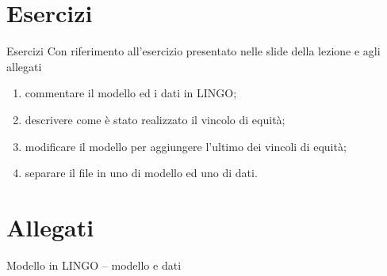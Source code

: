 \documentclass{beamer}
\begin{document}
\generatitolo

\section{Esercizi}

\begin{frame}
{Esercizi}
Con riferimento all'esercizio presentato nelle slide della lezione e agli allegati

\begin{enumerate}
 \item commentare il modello ed i dati in LINGO;
 \item descrivere come \`e stato realizzato il vincolo di equit\`a;
 \item modificare il modello per aggiungere l'ultimo dei vincoli di
	equit\`a;
 \item separare il file in uno di modello ed uno di dati.
\end{enumerate}

\end{frame}

\section{Allegati}

\framebreak

\begin{frame}[allowframebreaks]{Modello in LINGO -- modello e dati}

\end{frame}
\end{document}

